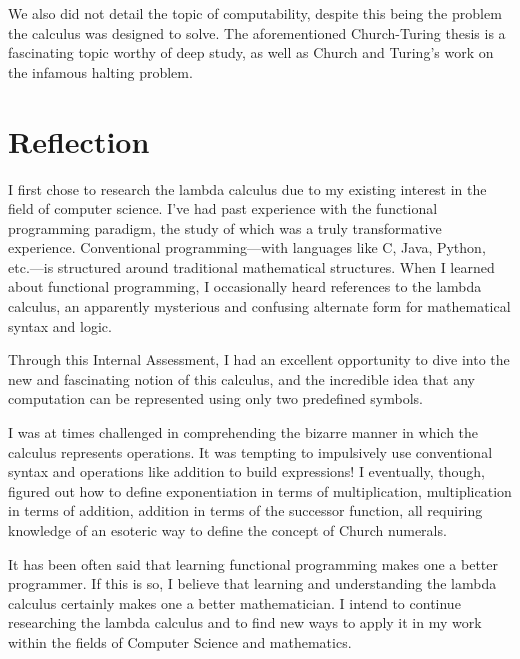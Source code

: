 \documentclass[twocolumn,titlepage,12pt]{article}
\begin{document}
We also did not detail the topic of computability, despite this being the problem the calculus was designed to solve. The aforementioned Church-Turing thesis is a fascinating topic worthy of deep study, as well as Church and Turing's work on the infamous halting problem.

\section{Reflection}
I first chose to research the lambda calculus due to my existing interest in the field of computer science. I've had past experience with the functional programming paradigm, the study of which was a truly transformative experience. Conventional programming---with languages like C, Java, Python, etc.---is structured around traditional mathematical structures. When I learned about functional programming, I occasionally heard references to the lambda calculus, an apparently mysterious and confusing alternate form for mathematical syntax and logic.

Through this Internal Assessment, I had an excellent opportunity to dive into the new and fascinating notion of this calculus, and the incredible idea that any computation can be represented using only two predefined symbols.

I was at times challenged in comprehending the bizarre manner in which the calculus represents operations. It was tempting to impulsively use conventional syntax and operations like addition to build expressions! I eventually, though, figured out how to define exponentiation in terms of multiplication, multiplication in terms of addition, addition in terms of the successor function, all requiring knowledge of an esoteric way to define the concept of Church numerals.

It has been often said that learning functional programming makes one a better programmer. If this is so, I believe that learning and understanding the lambda calculus certainly makes one a better mathematician. I intend to continue researching the lambda calculus and to find new ways to apply it in my work within the fields of Computer Science and mathematics.


\end{document}
